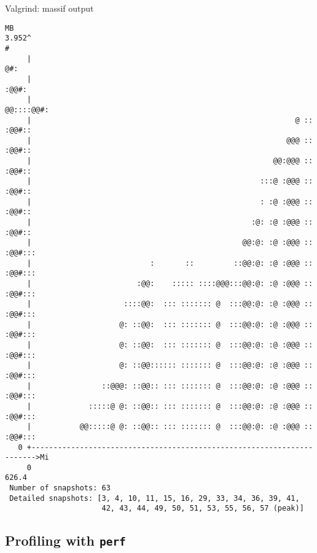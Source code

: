 \documentclass[10pt,xcolor=table]{beamer}
\begin{document}
\begin{frame}[fragile]{Valgrind: massif output}

  \begin{lstlisting}[style=valgrind,xleftmargin=-0.75cm,basicstyle=\scriptsize\ttfamily,] 
   MB
3.952^                                                                    #
     |                                                                   @#:
     |                                                                 :@@#:
     |                                                            @@::::@@#:
     |                                                            @ :: :@@#::
     |                                                          @@@ :: :@@#::
     |                                                       @@:@@@ :: :@@#::
     |                                                    :::@ :@@@ :: :@@#::
     |                                                    : :@ :@@@ :: :@@#::
     |                                                  :@: :@ :@@@ :: :@@#::
     |                                                @@:@: :@ :@@@ :: :@@#:::
     |                           :       ::         ::@@:@: :@ :@@@ :: :@@#:::
     |                        :@@:    ::::: ::::@@@:::@@:@: :@ :@@@ :: :@@#:::
     |                     ::::@@:  ::: ::::::: @  :::@@:@: :@ :@@@ :: :@@#:::
     |                    @: ::@@:  ::: ::::::: @  :::@@:@: :@ :@@@ :: :@@#:::
     |                    @: ::@@:  ::: ::::::: @  :::@@:@: :@ :@@@ :: :@@#:::
     |                    @: ::@@:::::: ::::::: @  :::@@:@: :@ :@@@ :: :@@#:::
     |                ::@@@: ::@@:: ::: ::::::: @  :::@@:@: :@ :@@@ :: :@@#:::
     |             :::::@ @: ::@@:: ::: ::::::: @  :::@@:@: :@ :@@@ :: :@@#:::
     |           @@:::::@ @: ::@@:: ::: ::::::: @  :::@@:@: :@ :@@@ :: :@@#:::
   0 +----------------------------------------------------------------------->Mi
     0                                                                   626.4
 Number of snapshots: 63
 Detailed snapshots: [3, 4, 10, 11, 15, 16, 29, 33, 34, 36, 39, 41,
                      42, 43, 44, 49, 50, 51, 53, 55, 56, 57 (peak)]
  \end{lstlisting}
\end{frame}


\subsection{Profiling with {\tt perf}}
\end{document}
